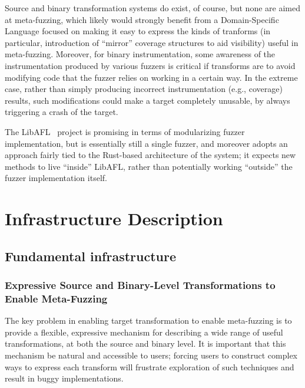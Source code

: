 Source and binary transformation systems do exist, of course, but none are 
aimed at meta-fuzzing, which likely would strongly benefit from a 
Domain-Specific Language focused on making it easy to express the kinds of 
tranforms (in particular, introduction of ``mirror'' coverage structures to aid 
visibility) useful in meta-fuzzing.  Moreover, for binary instrumentation, some 
awareness of the instrumentation produced by various fuzzers is critical if 
transforms are to avoid modifying code that the fuzzer relies on working in a 
certain way.  In the extreme case, rather than simply producing incorrect 
instrumentation (e.g., coverage) results, such modifications could make a 
target completely unusable, by always triggering a crash of the
target.

The LibAFL~\cite{libafl} project is promising in terms of modularizing fuzzer
implementation, but is essentially still a single fuzzer, and moreover adopts
an approach fairly tied to the Rust-based architecture of the system;
it expects new methods to live ``inside'' LibAFL, rather than
potentially working ``outside'' the fuzzer implementation itself.

\section{Infrastructure Description}

\subsection{Fundamental infrastructure}




\subsubsection{Expressive Source and Binary-Level Transformations to 
Enable Meta-Fuzzing}

The key problem in enabling target transformation to enable meta-fuzzing is to
provide a flexible, expressive mechanism for describing a wide range of useful
transformations, at both the source and binary level.  It is important that this
mechanism be natural and accessible to users; forcing users to 
construct complex ways to express each transform will frustrate exploration of such 
techniques and result in buggy implementations. 

